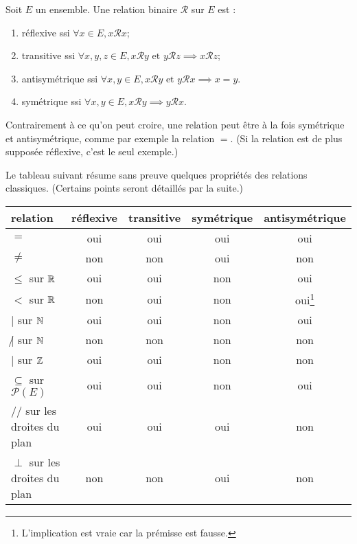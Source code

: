 \begin{definition}
Soit $E$ un ensemble. Une relation binaire ${\mathcal R}$ sur $E$ est : 
\begin{enumerate}
\item réflexive ssi $\forall x\in E, x{\mathcal R}x$;
\item transitive ssi $\forall x, y, z\in E, x\mathcal Ry \text{ et } y{\mathcal R}z \implies x{\mathcal R}z$;
\item antisymétrique ssi $\forall x, y \in E, x{\mathcal R}y\text{ et } y{\mathcal R}x \implies x=y$.
\item symétrique ssi $\forall x, y\in E, x\mathcal R y \implies y\mathcal R x$.
\end{enumerate}
\end{definition}

\begin{attention}
Contrairement à ce qu'on peut croire, une relation peut être à la fois symétrique et antisymétrique, comme par exemple la relation $=$. (Si la relation est de plus supposée réflexive, c'est le seul exemple.)
\end{attention}

Le tableau suivant résume sans preuve quelques propriétés des relations classiques. (Certains points seront détaillés par la suite.)\\

\begin{tabular}{|l|c|c|c|c|}\hline
relation & réflexive & transitive & symétrique & antisymétrique \\ \hline
$=$ & oui & oui & oui & oui \\ \hline
$\neq$ & non & non & oui & non \\ \hline
$\leq$ sur $\mathbb{R}$ & oui & oui & non & oui \\ \hline
$<$ sur $\mathbb{R}$ & non & oui & non & oui\footnote{L'implication est vraie car la prémisse est fausse.} \\ \hline
$|$ sur $\mathbb{N}$ & oui & oui & non & oui \\ \hline
$\not |$ sur $\mathbb{N}$ & non & non & non & non \\ \hline
$|$ sur $\mathbb{Z}$ & oui & oui & non & non \\ \hline
$\subseteq$ sur $\mathcal P(E)$ & oui & oui & non & oui \\ \hline
$//$ sur les droites du plan & oui & oui & oui & non \\ \hline
$\perp$ sur les droites du plan & non & non & oui & non \\ \hline
\end{tabular}


